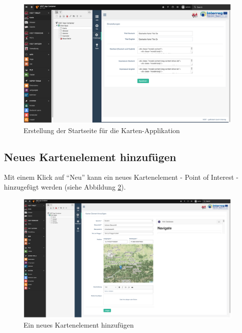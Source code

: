 \begin{figure}[ht!]
\centering
\includegraphics[width=12cm]{Figures/paula/karte/befuellte_startseite_karte.png}
\caption{Erstellung der Startseite für die Karten-Applikation}
\label{img:befuellte_startseite_karte}
\end{figure}

\subsection{Neues Kartenelement hinzufügen}

Mit einem Klick auf “Neu” kann ein neues Kartenelement - Point of Interest - hinzugefügt werden (siehe Abbildung \ref{img:neues_kartenelement_hinzufuegen}).

\begin{figure}[ht!]
\centering
\includegraphics[width=12cm]{Figures/paula/karte/neues_kartenelement_hinzufuegen.png}
\caption{Ein neues Kartenelement hinzufügen}
\label{img:neues_kartenelement_hinzufuegen}
\end{figure}

